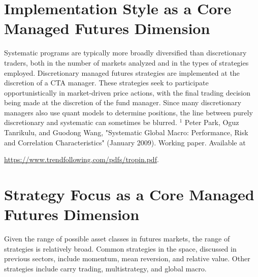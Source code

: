 \documentclass[11pt]{article}
\begin{document}
\section*{Implementation Style as a Core Managed Futures Dimension}
Systematic programs are typically more broadly diversified than discretionary traders, both in the number of markets analyzed and in the types of strategies employed. Discretionary managed futures strategies are implemented at the discretion of a CTA manager. These strategies seek to participate opportunistically in market-driven price actions, with the final trading decision being made at the discretion of the fund manager. Since many discretionary managers also use quant models to determine positions, the line between purely discretionary and systematic can sometimes be blurred. ${ }^{1}$ Peter Park, Oguz Tanrikulu, and Guodong Wang, "Systematic Global Macro: Performance, Risk and Correlation Characteristics" (January 2009). Working paper. Available at

\href{https://www.trendfollowing.com/pdfs/tropin.pdf}{https://www.trendfollowing.com/pdfs/tropin.pdf}.

\section*{Strategy Focus as a Core Managed Futures Dimension}
Given the range of possible asset classes in futures markets, the range of strategies is relatively broad. Common strategies in the space, discussed in previous sectors, include momentum, mean reversion, and relative value. Other strategies include carry trading, multistrategy, and global macro.
\end{document}
